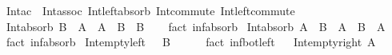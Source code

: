 \begin{isabellebody}
%
\isadelimproof
\isanewline
%
\endisadelimproof
\isanewline
{}\isamarkupfalse%
\ Int{\isacharunderscore}{\kern0pt}ac\ {\isacharequal}{\kern0pt}\ Int{\isacharunderscore}{\kern0pt}assoc\ Int{\isacharunderscore}{\kern0pt}left{\isacharunderscore}{\kern0pt}absorb\ Int{\isacharunderscore}{\kern0pt}commute\ Int{\isacharunderscore}{\kern0pt}left{\isacharunderscore}{\kern0pt}commute\isanewline
\ \ %
\isanewline
\isanewline
{}\isamarkupfalse%
\ Int{\isacharunderscore}{\kern0pt}absorb{}{\isacharcolon}{\kern0pt}\ {\isachardoublequoteopen}B\ {\isasymsubseteq}\ A\ {\isasymLongrightarrow}\ A\ {\isasyminter}\ B\ {\isacharequal}{\kern0pt}\ B{\isachardoublequoteclose}\isanewline
%
\isadelimproof
\ \ %
\endisadelimproof
%
\isatagproof
{}\isamarkupfalse%
\ {\isacharparenleft}{\kern0pt}fact\ inf{\isacharunderscore}{\kern0pt}absorb{}{\isacharparenright}{\kern0pt}%
\endisatagproof
{\isafoldproof}%
%
\isadelimproof
\isanewline
%
\endisadelimproof
\isanewline
{}\isamarkupfalse%
\ Int{\isacharunderscore}{\kern0pt}absorb{}{\isacharcolon}{\kern0pt}\ {\isachardoublequoteopen}A\ {\isasymsubseteq}\ B\ {\isasymLongrightarrow}\ A\ {\isasyminter}\ B\ {\isacharequal}{\kern0pt}\ A{\isachardoublequoteclose}\isanewline
%
\isadelimproof
\ \ %
\endisadelimproof
%
\isatagproof
{}\isamarkupfalse%
\ {\isacharparenleft}{\kern0pt}fact\ inf{\isacharunderscore}{\kern0pt}absorb{}{\isacharparenright}{\kern0pt}%
\endisatagproof
{\isafoldproof}%
%
\isadelimproof
\isanewline
%
\endisadelimproof
\isanewline
{}\isamarkupfalse%
\ Int{\isacharunderscore}{\kern0pt}empty{\isacharunderscore}{\kern0pt}left{\isacharcolon}{\kern0pt}\ {\isachardoublequoteopen}{\isacharbraceleft}{\kern0pt}{\isacharbraceright}{\kern0pt}\ {\isasyminter}\ B\ {\isacharequal}{\kern0pt}\ {\isacharbraceleft}{\kern0pt}{\isacharbraceright}{\kern0pt}{\isachardoublequoteclose}\isanewline
%
\isadelimproof
\ \ %
\endisadelimproof
%
\isatagproof
{}\isamarkupfalse%
\ {\isacharparenleft}{\kern0pt}fact\ inf{\isacharunderscore}{\kern0pt}bot{\isacharunderscore}{\kern0pt}left{\isacharparenright}{\kern0pt}%
\endisatagproof
{\isafoldproof}%
%
\isadelimproof
%
\endisadelimproof
\ \isanewline
\isanewline
{}\isamarkupfalse%
\ Int{\isacharunderscore}{\kern0pt}empty{\isacharunderscore}{\kern0pt}right{\isacharcolon}{\kern0pt}\ {\isachardoublequoteopen}A\ {\isasyminter}\ {\isacharbraceleft}{\kern0pt}{\isacharbraceright}{\kern0pt}\ {\isacharequal}{\kern0pt}\ {\isacharbraceleft}{\kern0pt}{\isacharbraceright}{\kern0pt}{\isachardoublequoteclose}\isanewline

\end{isabellebody}
